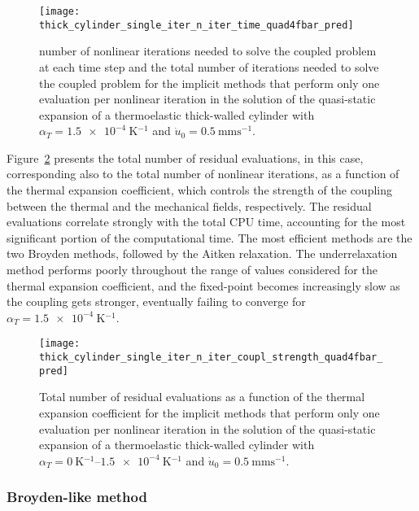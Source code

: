 \begin{figure}[htbp]
 \centering
 \texttt{[image: thick\_cylinder\_single\_iter\_n\_iter\_time\_quad4fbar\_pred]}
 \caption{number of nonlinear iterations needed to solve the coupled problem at each time step and the total number of iterations needed to solve the coupled problem for the implicit methods that perform only one evaluation per nonlinear iteration  in the solution of the quasi-static expansion of a thermoelastic thick-walled cylinder with \(\alpha_T=\SI{1.5e-4}{\kelvin^{-1}}\) and \(\dot u_0 =\SI{0.5}{\milli\meter\second^{-1}}\).}
\label{fig:thick_cylinder_single_iter_n_iter_time_quad4fbar_pred}
\end{figure}

Figure~\ref{fig:thick_cylinder_single_iter_n_iter_coupl_strength_quad4fbar_pred} presents the total number of residual evaluations, in this case, corresponding also to the total number of nonlinear iterations, as a function of the thermal expansion coefficient, which controls the strength of the coupling between the thermal and the mechanical fields, respectively.
The residual evaluations correlate strongly with the total CPU time, accounting for the most significant portion of the computational time.
The most efficient methods are the two Broyden methods, followed by the Aitken relaxation.
The underrelaxation method performs poorly throughout the range of values considered for the thermal expansion coefficient, and the fixed-point becomes increasingly slow as the coupling gets stronger, eventually failing to converge for \(\alpha_T=\SI{1.5e-4}{\kelvin^{-1}}\).

\begin{figure}[htbp]
 \centering
 \texttt{[image: thick\_cylinder\_single\_iter\_n\_iter\_coupl\_strength\_quad4fbar\_pred]}
 \caption{Total number of residual evaluations as a function of the thermal expansion coefficient for the implicit methods that perform only one evaluation per nonlinear iteration in the solution of the quasi-static expansion of a thermoelastic thick-walled cylinder with \(\alpha_T=\SIrange{0}{1.5e-4}{\kelvin^{-1}}\) and \(\dot u_0 =\SI{0.5}{\milli\meter\second^{-1}}\).}
\label{fig:thick_cylinder_single_iter_n_iter_coupl_strength_quad4fbar_pred}
\end{figure}

\FloatBarrier

\subsubsection{Broyden-like method}

